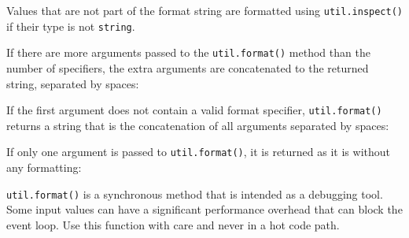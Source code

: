 Values that are not part of the format string are formatted using
\texttt{util.inspect()} if their type is not \texttt{string}.

If there are more arguments passed to the \texttt{util.format()} method
than the number of specifiers, the extra arguments are concatenated to
the returned string, separated by spaces:

\begin{Shaded}
\begin{Highlighting}[]
\NormalTok{(}\OperatorTok{,} \OperatorTok{,} \OperatorTok{,} \NormalTok{)}\OperatorTok{;}
\end{Highlighting}
\end{Shaded}

If the first argument does not contain a valid format specifier,
\texttt{util.format()} returns a string that is the concatenation of all
arguments separated by spaces:

\begin{Shaded}
\begin{Highlighting}[]
\NormalTok{(}\OperatorTok{,} \OperatorTok{,} \NormalTok{)}\OperatorTok{;}
\end{Highlighting}
\end{Shaded}

If only one argument is passed to \texttt{util.format()}, it is returned
as it is without any formatting:

\begin{Shaded}
\begin{Highlighting}[]
\NormalTok{(}\NormalTok{)}\OperatorTok{;}
\end{Highlighting}
\end{Shaded}

\texttt{util.format()} is a synchronous method that is intended as a
debugging tool. Some input values can have a significant performance
overhead that can block the event loop. Use this function with care and
never in a hot code path.

